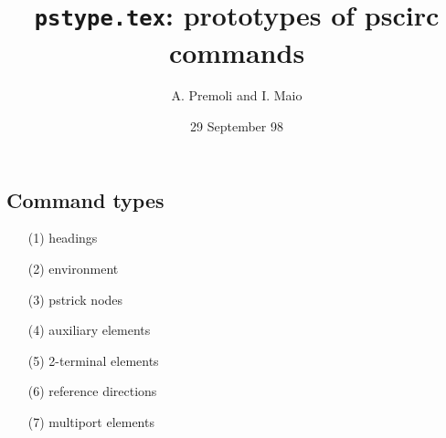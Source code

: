 \documentclass[12pt,a4paper]{article}
\title{\bfseries\vspace*{-1.5cm}
\texttt{pstype.tex}: prototypes of pscirc commands}
\author{A. Premoli and I. Maio}
\date{29 September 98}
\begin{document}
\maketitle

\subsection*{Command types}
\begin{itemize}
\item[(1)] headings
\item[(2)] environment
\item[(3)] pstrick nodes
\item[(4)] auxiliary elements
\item[(5)] 2-terminal elements
\item[(6)] reference directions
\item[(7)] multiport elements
\end{itemize}
\end{document}
